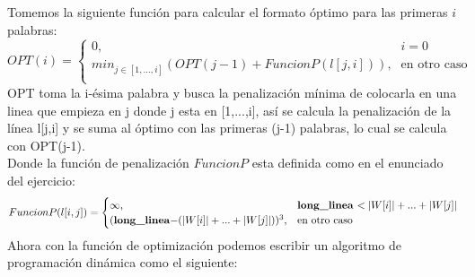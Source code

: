 \documentclass[12pt]{article}
\begin{document}
	Tomemos la siguiente función para calcular el formato óptimo para las primeras $i$ palabras: 
	\begin{equation}\label{f_ej3.2}
	OPT(i) = 
	\begin{cases}
	\text{0,} &\text{$i = 0$}\\
	\text{$min_{j \in [1,...,i]}(OPT(j - 1) + FuncionP(l[j,i]))$,} &\text{en otro caso} \\
	\end{cases}
	\end{equation}
	OPT toma la i-ésima palabra y busca la penalización mínima de colocarla en una linea que empieza en j donde j esta en [1,...,i], así se calcula la penalización de la línea l[j,i] y se suma al óptimo con las primeras (j-1) palabras, lo cual se calcula con OPT(j-1).\\
	Donde la función de penalización $FuncionP$ esta definida como en el enunciado del ejercicio:
	\begin{equation}\label{f_ej3.3}
	FuncionP(l[i,j]) = 
	\begin{cases}
	\text{$\infty$,} &\text{\textbf{long\_linea} $< |W[i]| + ... + |W[j]|$}\\
	\text{$($\textbf{long\_linea}$-(|W[i]| + ... + |W[j]|))^3$,} &\text{en otro caso} \\
	\end{cases}
	\end{equation}
	Ahora con la función de optimización podemos escribir un algoritmo de programación dinámica como el siguiente:\\
\end{document}
